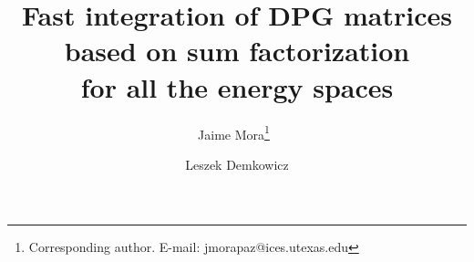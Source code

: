 \documentclass[10pt]{article}%
\numberwithin{equation}{section}%
\begin{document}

\title{\vspace*{-35pt}Fast integration of DPG matrices based on sum factorization\\ for all the energy spaces}
\author{Jaime Mora\thanks{Corresponding author. E-mail: jmorapaz@ices.utexas.edu}\ }
\author{Leszek Demkowicz}
\date{}

\maketitle











%
%
%
%
\end{document}
